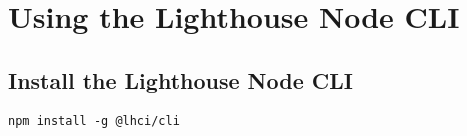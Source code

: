 \section{Using the Lighthouse Node CLI}
\subsection{Install the Lighthouse Node CLI}
\begin{verbatim}
npm install -g @lhci/cli
\end{verbatim}

